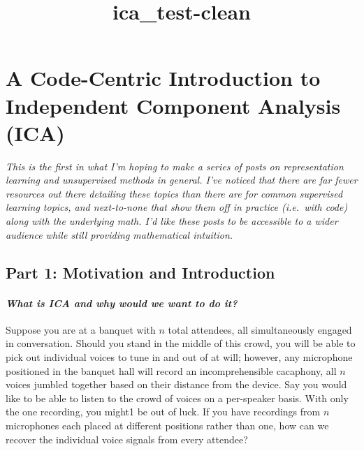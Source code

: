 \documentclass[11pt]{article}
\title{ica\_test-clean}
\begin{document}
    
    
    \maketitle
    
    

    
    \hypertarget{a-code-centric-introduction-to-independent-component-analysis-ica}{%
\section{A Code-Centric Introduction to Independent Component Analysis
(ICA)}\label{a-code-centric-introduction-to-independent-component-analysis-ica}}

    \emph{This is the first in what I'm hoping to make a series of posts on
representation learning and unsupervised methods in general. I've
noticed that there are far fewer resources out there detailing these
topics than there are for common supervised learning topics, and
next-to-none that show them off in practice (i.e.~with code) along with
the underlying math. I'd like these posts to be accessible to a wider
audience while still providing mathematical intuition.}

    \hypertarget{part-1-motivation-and-introduction}{%
\subsection{Part 1: Motivation and
Introduction}\label{part-1-motivation-and-introduction}}

\hypertarget{what-is-ica-and-why-would-we-want-to-do-it}{%
\paragraph{\texorpdfstring{\emph{What is ICA and why would we want to do
it?}}{What is ICA and why would we want to do it?}}\label{what-is-ica-and-why-would-we-want-to-do-it}}

    Suppose you are at a banquet with \(n\) total attendees, all
simultaneously engaged in conversation. Should you stand in the middle
of this crowd, you will be able to pick out individual voices to tune in
and out of at will; however, any microphone positioned in the banquet
hall will record an incomprehensible cacaphony, all \(n\) voices jumbled
together based on their distance from the device. Say you would like to
be able to listen to the crowd of voices on a per-speaker basis. With
only the one recording, you might1 be out of luck. If you have
recordings from \(n\) microphones each placed at different positions
rather than one, how can we recover the individual voice signals from
every attendee?
\end{document}
